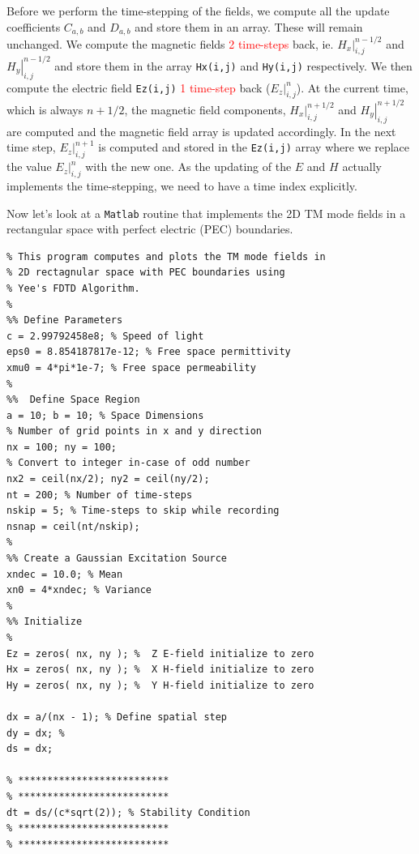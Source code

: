 \documentclass[12pt]{article}
\begin{document}
\begin{outline}[enumerate]
  \1 Before we perform the time-stepping of the fields, we compute all the update coefficients $C_{a,b}$ and $D_{a,b}$ and store them in an array. These will remain unchanged.
  \1 We compute the magnetic fields \textcolor{red}{2 time-steps} back, ie. $\left. H_x \right|^{n - 1/2}_{i,j}$ and $\left. H_y \right|^{n - 1/2}_{i,j}$ and store them in the array \texttt{Hx(i,j)} and \texttt{Hy(i,j)} respectively.
  \1 We then compute the electric field \texttt{Ez(i,j)} \textcolor{red}{1 time-step} back ($\left. E_z \right|^{n}_{i,j}$).
  \1 At the current time, which is always $n + 1/2$, the magnetic field components, $\left. H_x \right|^{n + 1/2}_{i,j}$ and $\left. H_y \right|^{n + 1/2}_{i,j}$ are computed and the magnetic field array is updated accordingly.
  \1 In the next time step, $\left. E_z \right|^{n+1}_{i,j}$ is computed and stored in the \texttt{Ez(i,j)} array where we replace the value $\left. E_z \right|^{n}_{i,j}$ with the new one.
  \1 As the updating of the $E$ and $H$ actually implements the time-stepping, we need to have a time index explicitly.
\end{outline}

Now let's look at a \texttt{Matlab} routine that implements the 2D TM mode fields in a rectangular space with perfect electric (PEC) boundaries.

\begin{mdframed}[backgroundcolor=gray!20]
  \scriptsize
  \begin{verbatim}
% This program computes and plots the TM mode fields in 
% 2D rectagnular space with PEC boundaries using 
% Yee's FDTD Algorithm. 
%
%% Define Parameters
c = 2.99792458e8; % Speed of light
eps0 = 8.854187817e-12; % Free space permittivity
xmu0 = 4*pi*1e-7; % Free space permeability
%
%%  Define Space Region
a = 10; b = 10; % Space Dimensions
% Number of grid points in x and y direction
nx = 100; ny = 100; 
% Convert to integer in-case of odd number
nx2 = ceil(nx/2); ny2 = ceil(ny/2); 
nt = 200; % Number of time-steps
nskip = 5; % Time-steps to skip while recording
nsnap = ceil(nt/nskip);
%
%% Create a Gaussian Excitation Source
xndec = 10.0; % Mean
xn0 = 4*xndec; % Variance
%
%% Initialize
%
Ez = zeros( nx, ny ); %  Z E-field initialize to zero
Hx = zeros( nx, ny ); %  X H-field initialize to zero
Hy = zeros( nx, ny ); %  Y H-field initialize to zero

dx = a/(nx - 1); % Define spatial step
dy = dx; %
ds = dx;

% **************************
% **************************
dt = ds/(c*sqrt(2)); % Stability Condition
% **************************
% **************************

\end{verbatim}
\end{mdframed}
\end{document}
